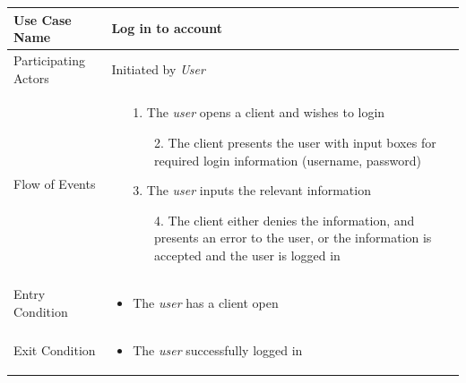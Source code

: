 \begin{center}
	\begin{tabular}{ | l | p{10cm} |  }
		 \hline
		Use Case Name & Log in to account \\ \hline
		Participating Actors & Initiated by \emph{User} \\ \hline
		Flow of Events & \begin{enumerate}
						\item[1.] The \emph{user} opens a client and wishes to login
						\begin{enumerate}
							\item[2.] The client presents the user with input boxes for required login information (username, password)
						\end{enumerate}
						\item[3.] The \emph{user} inputs the relevant information
						\begin{enumerate}
							\item[4.] The client either denies the information, and presents an error to the user, or the information is accepted and the user is logged in
						\end{enumerate}
					\end{enumerate} \\ \hline
		Entry Condition & \begin{itemize}
						\item The \emph{user} has a client open
					\end{itemize} \\ \hline
		Exit Condition & \begin{itemize}
						\item The \emph{user} successfully logged in
					\end{itemize} \\
		\hline
	\end{tabular}
\end{center}


